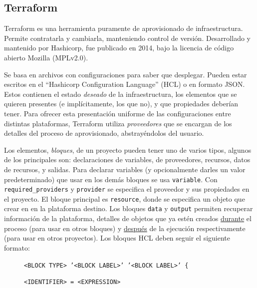 \documentclass[11pt]{article}
\begin{document}
\begin{flushleft}
\clearpage
\section{Terraform}
Terraform es una herramienta puramente de aprovisionado de infraestructura. Permite contratarla y cambiarla, manteniendo control de versión. Desarrollado y mantenido por Hashicorp, fue publicado en 2014, bajo la licencia de código abierto Mozilla (MPLv2.0). 
\linebreak

Se basa en archivos con configuraciones para saber que desplegar. Pueden estar escritos en el ``Hashicorp Configuration Language'' (HCL) o en formato JSON. Estos contienen el estado \textit{deseado} de la infraestructura, los elementos que se quieren presentes (e implícitamente, los que no), y que propiedades deberían tener. Para ofrecer esta presentación uniforme de las configuraciones entre distintas plataformas, Terraform utiliza \textit{proveedores} que se encargan de los detalles del proceso de aprovisionado, abstrayéndolos del usuario.
\linebreak


Los elementos, \textit{bloques}, de un proyecto pueden tener uno de varios tipos, algunos de los principales son: declaraciones de variables, de proveedores, recursos, datos de recursos, y salidas. Para declarar variables (y opcionalmente darles un valor predeterminado) que usar en los demás bloques se usa \texttt{variable}. Con \texttt{required\_providers} y \texttt{provider} se especifica el proveedor y sus propiedades en el proyecto. El bloque principal es \texttt{resource}, donde se especifica un objeto que crear en en la plataforma destino. Los bloques \texttt{data} y \texttt{output} permiten recuperar información de la plataforma, detalles de objetos que ya estén creados \underline{durante} el proceso (para usar en otros bloques) y \underline{después} de la ejecución respectivamente (para usar en otros proyectos). Los bloques HCL deben seguir el siguiente formato:
\linebreak

	\begin{figure}[htb]
		\footnotesize
		\hspace{3.5cm}
		\texttt{<BLOCK TYPE>\ '<BLOCK LABEL>' '<BLOCK LABEL>' \{} 
		
		\hspace{4.5cm}
		\texttt{\color{gray}{\# Block body}}
		
		\hspace{4.5cm}
		\texttt{<IDENTIFIER>\ =\ <EXPRESSION>\ \color{gray}{\# Argument}} 


\end{figure}
\end{flushleft}
\end{document}
